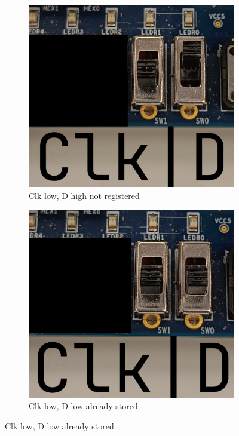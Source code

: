 \documentclass{article}
\begin{document}
\clearpage
\begin{figure}[h]
    \centering
    \begin{subfigure}[t]{0.45\textwidth}
        \centering
        \includegraphics[width=1\textwidth]{Figures/Part2b_1.jpg}
        \caption{Clk low, D high not registered}
        \label{fig:p2b_1}
    \end{subfigure}
    \hfill
    \begin{subfigure}[t]{0.45\textwidth}
        \centering
        \includegraphics[width=1\textwidth]{Figures/Part2b_2.jpg}
        \caption{Clk low, D low already stored}
        \label{fig:p2b_2}
    \end{subfigure}
    

\end{figure}
\end{document}
